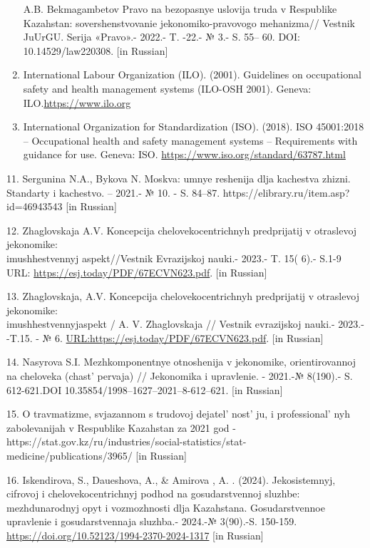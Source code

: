 \begin{references}
\begin{enumerate}
  A.B. Bekmagambetov Pravo na bezopasnye uslovija truda v Respublike
  Kazahstan: sovershenstvovanie jekonomiko-pravovogo mehanizma// Vestnik
  JuUrGU. Serija «Pravo».- 2022.- T. -22.- № 3.- S. 55-- 60. DOI:
  10.14529/law220308. {[}in Russian{]}
\item
  International Labour Organization (ILO). (2001). Guidelines on
  occupational safety and health management systems (ILO-OSH 2001).
  Geneva: ILO.\href{https://www.ilo.org/global/topics/safety-and-health-at-work/WCMS\_107727/lang-\/-en/index.htm}{https://www.ilo.org}
\item
  International Organization for Standardization (ISO). (2018). ISO
  45001:2018 -- Occupational health and safety management systems --
  Requirements with guidance for use. Geneva: ISO.
  \url{https://www.iso.org/standard/63787.html}
\end{enumerate}

11. Sergunina N.A., Bykova N. Moskva: umnye reshenija dlja kachestva
zhizni. Standarty i kachestvo. -- 2021.- № 10. - S. 84--87.
https://elibrary.ru/item.asp?id=46943543 {[}in Russian{]}

12. Zhaglovskaja A.V. Koncepcija chelovekocentrichnyh predprijatij v
otraslevoj jekonomike: \\imushhestvennyj aspekt//Vestnik Evrazijskoj
nauki.- 2023.- T. 15( 6).- S.1-9 URL:
\url{https://esj.today/PDF/67ECVN623.pdf}. {[}in Russian{]}

13. Zhaglovskaja, A.V. Koncepcija chelovekocentrichnyh predprijatij v
otraslevoj jekonomike: \\imushhestvennyjaspekt / A. V. Zhaglovskaja //
Vestnik evrazijskoj nauki.- 2023.- -T.15. - № 6.
\url{URL:https://esj.today/PDF/67ECVN623.pdf}. {[}in Russian{]}

14. Nasyrova S.I. Mezhkomponentnye otnoshenija v jekonomike,
orientirovannoj na cheloveka (chast'{} pervaja) //
Jekonomika i upravlenie. - 2021.-№ 8(190).- S. 612-621.DOI
10.35854/1998--1627--2021--8-612--621. {[}in Russian{]}

15. O travmatizme, svjazannom s trudovoj
dejatel' nost' ju, i
professional' nyh zabolevanijah v Respublike Kazahstan za
2021 god -
https://stat.gov.kz/ru/industries/social-statistics/stat-medicine/publications/3965/
{[}in Russian{]}

16. Iskendirova, S., Daueshova, A., \& Amirova , A. . (2024).
Jekosistemnyj, cifrovoj i chelovekocentrichnyj podhod na gosudarstvennoj
sluzhbe: mezhdunarodnyj opyt i vozmozhnosti dlja Kazahstana.
Gosudarstvennoe upravlenie i gosudarstvennaja sluzhba.- 2024.-№
3(90).-S. 150-159. \url{https://doi.org/10.52123/1994-2370-2024-1317}
{[}in Russian{]}
\end{references}
